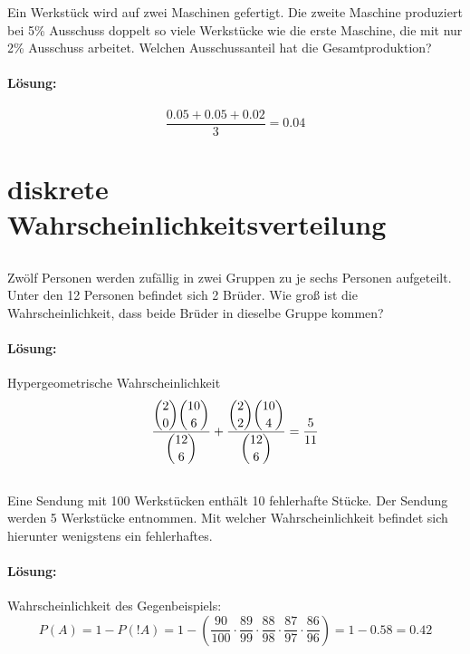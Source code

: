 \documentclass[ngerman]{scrartcl}
\begin{document}
Ein Werkstück wird auf zwei Maschinen gefertigt. Die zweite Maschine produziert bei 5\% Ausschuss doppelt so viele Werkstücke wie die erste Maschine, die mit nur 2\% Ausschuss arbeitet. Welchen Ausschussanteil hat die Gesamtproduktion?

\paragraph{Lösung:}
\begin{equation*}
\frac{0.05 + 0.05 + 0.02}{3} = 0.04
\end{equation*}

\section{diskrete Wahrscheinlichkeitsverteilung}

\subsection{}
Zwölf Personen werden zufällig in zwei Gruppen zu je sechs Personen aufgeteilt. Unter den 12 Personen befindet sich 2 Brüder. Wie groß ist die Wahrscheinlichkeit, dass beide Brüder in dieselbe Gruppe kommen?
\paragraph{Lösung:}
Hypergeometrische Wahrscheinlichkeit
\begin{equation*}
\frac{\dbinom{2}{0}\dbinom{10}{6}}{\dbinom{12}{6}} +
\frac{\dbinom{2}{2}\dbinom{10}{4}}{\dbinom{12}{6}} = \frac{5}{11}
\end{equation*}

\subsection{}
Eine Sendung mit 100 Werkstücken enthält 10 fehlerhafte Stücke. Der Sendung werden 5 Werkstücke entnommen. Mit welcher Wahrscheinlichkeit befindet sich hierunter wenigstens ein fehlerhaftes. 
\paragraph{Lösung:}
Wahrscheinlichkeit des Gegenbeispiels:
\begin{equation*}
P(A) = 1 - P(!A) = 1 - \left(\frac{90}{100} \cdot \frac{89}{99} \cdot \frac{88}{98} \cdot \frac{87}{97} \cdot \frac{86}{96}\right) = 1 - 0.58 = 0.42
\end{equation*}
\end{document}
